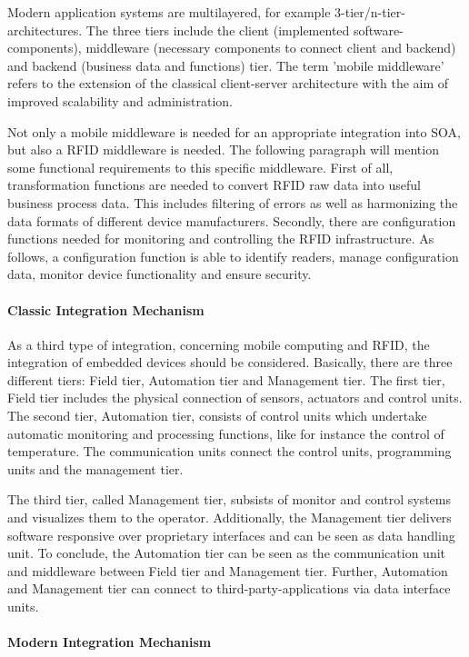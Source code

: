 Modern application systems are multilayered, for example 3-tier/n-tier-architectures. The three tiers include the client (implemented software-components), middleware (necessary components to connect client and backend) and backend (business data and functions) tier. The term 'mobile middleware' refers to the extension of the classical client-server architecture with the aim of improved scalability and administration.

Not only a mobile middleware is needed for an appropriate integration into SOA, but also a RFID middleware is needed. The following paragraph will mention some functional requirements to this specific middleware. First of all, transformation functions are needed to convert RFID raw data into useful business process data. This includes filtering of errors as well as harmonizing the data formats of different device manufacturers. Secondly, there are configuration functions needed for monitoring and controlling the RFID infrastructure. As follows, a configuration function is able to identify readers, manage configuration data, monitor device functionality and ensure security.  

\paragraph{Classic Integration Mechanism}

As a third type of integration, concerning mobile computing and RFID, the integration of embedded devices should be considered. Basically, there are three different tiers: Field tier, Automation tier and Management tier. The first tier, Field tier includes the physical connection of sensors, actuators and control units. The second tier, Automation tier, consists of control units which undertake automatic monitoring and processing functions, like for instance the control of temperature. The communication units connect the control units, programming units and the management tier. 

The third tier, called Management tier, subsists of monitor and control systems and visualizes them to the operator. Additionally, the Management tier delivers software responsive over proprietary interfaces and can be seen as data handling unit. 
To conclude, the Automation tier can be seen as the communication unit and middleware between Field tier and Management tier. Further, Automation and Management tier can connect to third-party-applications via data interface units.
 
\paragraph{Modern Integration Mechanism}

